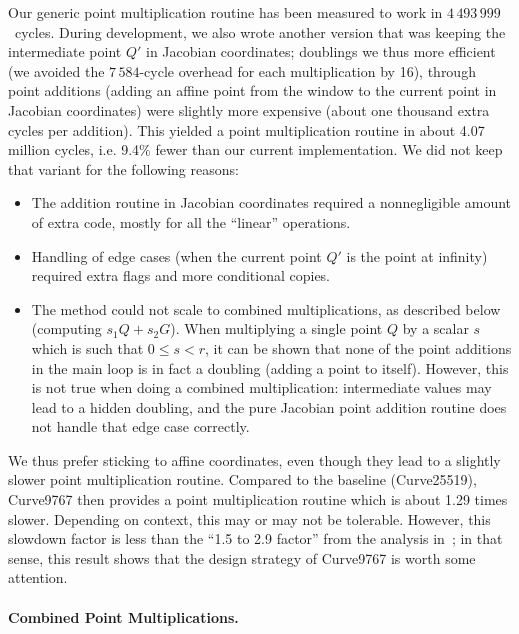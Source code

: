 \documentclass{llncs}
\begin{document}
Our generic point multiplication routine has been measured to work in
$4\,493\,999$~cycles. During development, we also wrote another version that was
keeping the intermediate point $Q'$ in Jacobian coordinates; doublings
we thus more efficient (we avoided the $7\,584$-cycle overhead for each
multiplication by 16), through point additions (adding an affine point
from the window to the current point in Jacobian coordinates) were
slightly more expensive (about one thousand extra cycles per addition).
This yielded a point multiplication routine in about 4.07 million
cycles, i.e. 9.4\% fewer than our current implementation. We did not
keep that variant for the following reasons:
\begin{itemize}

    \item The addition routine in Jacobian coordinates required a
    nonnegligible amount of extra code, mostly for all the ``linear''
    operations.

    \item Handling of edge cases (when the current point $Q'$ is the
    point at infinity) required extra flags and more conditional
    copies.

    \item The method could not scale to combined multiplications, as
    described below (computing $s_1Q + s_2G$). When multiplying a single
    point $Q$ by a scalar $s$ which is such that $0 \leq s < r$, it can
    be shown that none of the point additions in the main loop is in
    fact a doubling (adding a point to itself). However, this is not
    true when doing a combined multiplication: intermediate values may
    lead to a hidden doubling, and the pure Jacobian point addition
    routine does not handle that edge case correctly.

\end{itemize}

We thus prefer sticking to affine coordinates, even though they lead to
a slightly slower point multiplication routine. Compared to the baseline
(Curve25519), Curve9767 then provides a point multiplication routine
which is about 1.29 times slower. Depending on context, this may or may
not be tolerable. However, this slowdown factor is less than the ``1.5
to 2.9 factor'' from the analysis in~\cite{SchSpr2019}; in that sense,
this result shows that the design strategy of Curve9767 is worth some
attention.

\paragraph{Combined Point Multiplications.}
\end{document}
